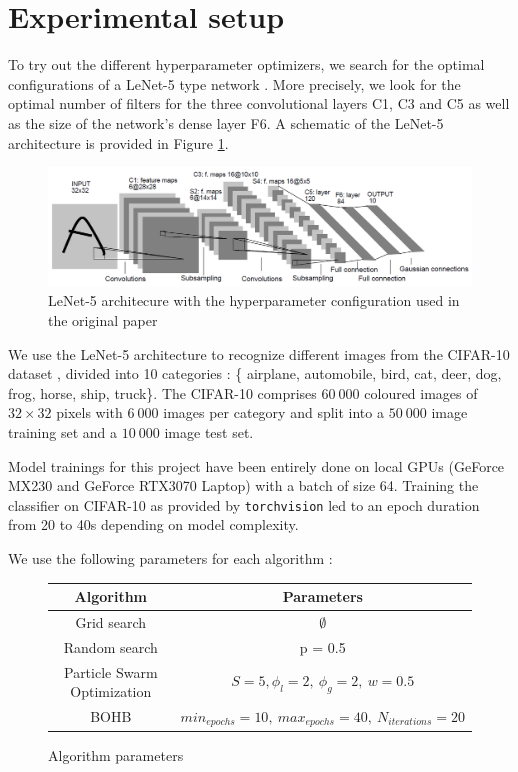 \documentclass[a4 paper,11pt,2]{article}
\begin{document}
\section{Experimental setup}
To try out the different hyperparameter optimizers, we search for the optimal configurations of a LeNet-5 type network \cite{lecunGradientbasedLearningApplied1998}. More precisely, we look for the optimal number of filters for the three convolutional layers C1, C3 and C5 as well as the size of the network's dense layer F6. A schematic of the LeNet-5 architecture is provided in Figure \ref{fig:lenet}.

\begin{figure}[h]
\centering
\includegraphics[width = \linewidth]{ln5.png}
\caption{LeNet-5 architecure with the hyperparameter configuration used in the original paper}
\label{fig:lenet}
\end{figure}

We use the LeNet-5 architecture to recognize different images from the CIFAR-10 dataset \cite{krizhevskyLearningMultiplyeLayers2009}, divided into 10 categories : \{ airplane, automobile, bird, cat, deer, dog, frog, horse, ship, truck\}. The CIFAR-10 comprises $60\ 000$ coloured images of $32\times32$ pixels with $6\ 000$ images per category and split into a $50\ 000$ image training set and a $10\ 000$ image test set.

Model trainings for this project have been entirely done on local GPUs (GeForce MX230 and GeForce RTX3070 Laptop) with a batch of size 64. Training the classifier on CIFAR-10 as provided by \verb+torchvision+ led to an epoch duration from 20 to 40s depending on model complexity.

We use the following parameters for each algorithm :
\begin{figure}[h]
\centering
\begin{tabular}{|c|c|}
\hline Algorithm & Parameters \\
\hline Grid search & $\emptyset$ \\
Random search & p = 0.5 \\
Particle Swarm Optimization & $S=5,\phi_l = 2,\ \phi_g = 2,\ w=0.5$\\
BOHB & $min_{epochs} = 10,\ max_{epochs} = 40,\ N_{iterations} = 20$\\
\hline
\end{tabular}
\label{tab:parameters}
\caption{Algorithm parameters}
\end{figure}
\end{document}
